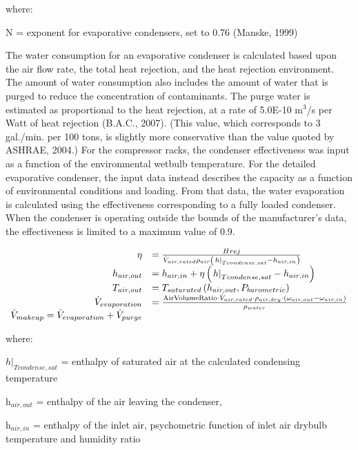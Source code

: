 where:

N = exponent for evaporative condensers, set to 0.76 (Manske, 1999)

The water consumption for an evaporative condenser is calculated based upon the air flow rate, the total heat rejection, and the heat rejection environment. The amount of water consumption also includes the amount of water that is purged to reduce the concentration of contaminants. The purge water is estimated as proportional to the heat rejection, at a rate of 5.0E-10 m\(^{3}\)/s per Watt of heat rejection (B.A.C., 2007). (This value, which corresponds to 3 gal./min. per 100 tons, is slightly more conservative than the value quoted by ASHRAE, 2004.) For the compressor racks, the condenser effectiveness was input as a function of the environmental wetbulb temperature. For the detailed evaporative condenser, the input data instead describes the capacity as a function of environmental conditions and loading. From that data, the water evaporation is calculated using the effectiveness corresponding to a fully loaded condenser. When the condenser is operating outside the bounds of the manufacturer's data, the effectiveness is limited to a maximum value of 0.9.

\begin{equation}
  \begin{array}{rl}
    \eta &= \frac{Hrej}{\dot{V}_{air,rated} \rho_{air} \left(\left. h \right|_{Tcondense,sat} - h_{air,in}\right)} \\
    h_{air,out} &= h_{air,in} + \eta \left(\left. h \right|_{Tcondense,sat} - h_{air,in}\right) \\
    T_{air,out} &= T_{saturated}\left(h_{air,out},P_{barometric}\right) \\
    \dot{V}_{evaporation} &= \frac{\text{AirVolumeRatio} \cdot \dot{V}_{air,rated} \cdot \rho_{air,dry} \cdot \left(\omega_{air,out} - \omega_{air,in}\right)}{\rho_{water}} \\
    \dot{V}_{makeup} = \dot{V}_{evaporation} + \dot{V}_{purge}
  \end{array}
\end{equation}

where:

\({\left. h \right|_{Tcondense,sat}}\) = enthalpy of saturated air at the calculated condensing temperature

h\(_{air,out}\) = enthalpy of the air leaving the condenser,

h\(_{air,in}\) = enthalpy of the inlet air, psychometric function of inlet air drybulb temperature and humidity ratio

